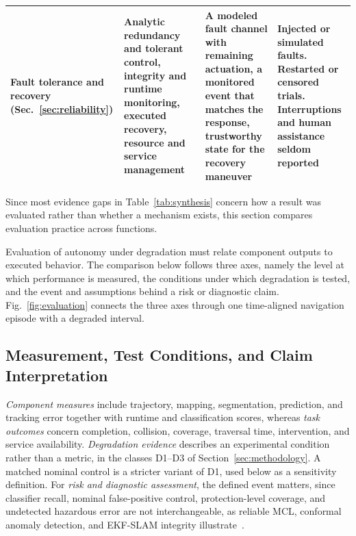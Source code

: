 \begin{table}[t]
\begin{tabularx}{\linewidth}{@{}L{2.35cm}YYY@{}}
\addlinespace[3pt]
Fault tolerance and recovery (Sec.~\ref{sec:reliability}) & Analytic redundancy and tolerant control, integrity and runtime monitoring, executed recovery, resource and service management~\cite{P_E51,P_X07,P_E59,P_R32} & A modeled fault channel with remaining actuation, a monitored event that matches the response, trustworthy state for the recovery maneuver~\cite{P_E52,P_M35} & Injected or simulated faults. Restarted or censored trials. Interruptions and human assistance seldom reported~\cite{P_E55,P_N10,P_N17} \\
\bottomrule
\end{tabularx}
\end{table}

Since most evidence gaps in Table~\ref{tab:synthesis} concern how a result was evaluated rather than whether a mechanism exists, this section compares evaluation practice across functions.

Evaluation of autonomy under degradation must relate component outputs to executed behavior. The comparison below follows three axes, namely the level at which performance is measured, the conditions under which degradation is tested, and the event and assumptions behind a risk or diagnostic claim. Fig.~\ref{fig:evaluation} connects the three axes through one time-aligned navigation episode with a degraded interval.



\subsection{Measurement, Test Conditions, and Claim Interpretation}

\emph{Component measures} include trajectory, mapping, segmentation, prediction, and tracking error together with runtime and classification scores, whereas \emph{task outcomes} concern completion, collision, coverage, traversal time, intervention, and service availability. \emph{Degradation evidence} describes an experimental condition rather than a metric, in the classes D1--D3 of Section~\ref{sec:methodology}. A matched nominal control is a stricter variant of D1, used below as a sensitivity definition. For \emph{risk and diagnostic assessment}, the defined event matters, since classifier recall, nominal false-positive control, protection-level coverage, and undetected hazardous error are not interchangeable, as reliable MCL, conformal anomaly detection, and EKF-SLAM integrity illustrate~\cite{P_M35,P_E54,P_X07}.

